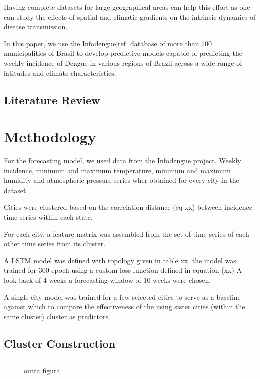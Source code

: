 \documentclass[12pt]{report}
\begin{document}
Having complete datasets for large geographical areas can help this effort as one can study the effects of spatial and climatic gradients on the intrinsic dynamics of disease transmission. 

In this paper, we use the Infodengue[ref] database of more than 700 municipalities of Brasil to develop predictive models capable of predicting the weekly incidence of Dengue in various regions of Brazil across a wide range of latitudes and climate characteristics.

\newpage
\section{Literature Review}

\newpage
\chapter{Methodology}

For the forecasting model, we used data from the Infodengue project. Weekly 
incidence, minimum and maximum temperature, minimum and maximum humidity and 
atmospheric pressure series wher obtained for every city in the dataset.

Cities were clustered based on the correlation distance (eq xx) between 
incidence time series within each state.

For each city, a feature matrix was assembled from the set of time series of 
each other time series from its cluster.

A LSTM model was defined with topology given in table xx. the model was trained 
for 300 epoch using a custom loss function defined in equation (xx) A look back 
of 4 weeks a forecasting window of 10 weeks were chosen.

A single city model was trained for a few selected cities to serve as a 
baseline against which to compare the effectiveness of the using sister 
cities (within the same cluster) cluster as predictors.

\section{Cluster Construction}

\section{}

\newpage
\begin{figure}[H]
\centering
\label{fig:outra}

\caption{outra figura}

\end{figure}
\end{document}
